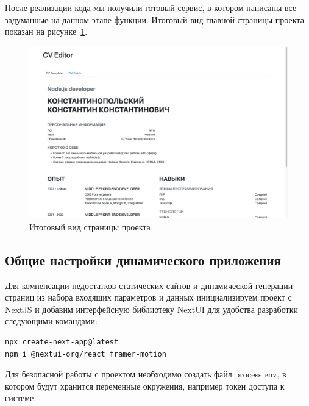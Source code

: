 \documentclass[master, och, diploma]{SCWorks}
\begin{document}
После реализации кода мы получили готовый сервис, в котором написаны все задуманные на данном этапе функции. Итоговый вид главной страницы проекта показан на рисунке~\ref{fig:26}.
\begin{figure}[!ht]
    \centering
    \includegraphics[width=12cm]{images/image26.png}
    \caption{\label{fig:26}%
        Итоговый вид страницы проекта}
\end{figure} 


\subsection{Общие настройки динамического приложения}
Для компенсации недостатков статических сайтов и динамической генерации страниц из набора входящих параметров и данных инициализируем проект с NextJS и добавим интерфейсную библиотеку NextUI для удобства разработки следующими командами:
\begin{verbatim}
npx create-next-app@latest
npm i @nextui-org/react framer-motion
\end{verbatim}

Для безопасной работы с проектом необходимо создать файл process.env, в котором будут хранится переменные окружения, например токен доступа к системе.
\end{document}
